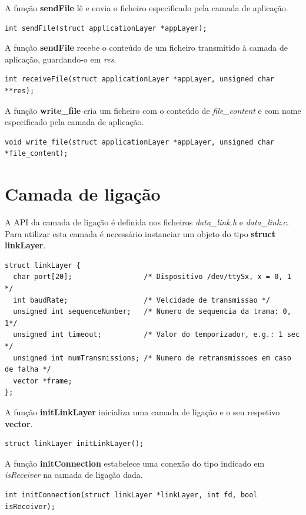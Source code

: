 \documentclass[11pt]{report}
\begin{document}
A função \textbf{sendFile} lê e envia o ficheiro especificado pela camada de aplicação.
\begin{lstlisting}
int sendFile(struct applicationLayer *appLayer);
\end{lstlisting}

A função \textbf{sendFile} recebe o conteúdo de um ficheiro transmitido à camada de aplicação,
guardando-o em \textit{res}.
\begin{lstlisting}
int receiveFile(struct applicationLayer *appLayer, unsigned char **res);
\end{lstlisting}

A função \textbf{write\_file} cria um ficheiro com o conteúdo de \textit{file\_content}
e com nome especificado pela camada de aplicação.
\begin{lstlisting}
void write_file(struct applicationLayer *appLayer, unsigned char *file_content);
\end{lstlisting}

\section{Camada de ligação}

A API da camada de ligação é definida nos ficheiros \textit{data\_link.h} e
\textit{data\_link.c}. Para utilizar esta camada é necessário instanciar um objeto
do tipo \textbf{struct linkLayer}.

\begin{lstlisting}
struct linkLayer {
  char port[20];                 /* Dispositivo /dev/ttySx, x = 0, 1 */
  int baudRate;                  /* Velcidade de transmissao */
  unsigned int sequenceNumber;   /* Numero de sequencia da trama: 0, 1*/
  unsigned int timeout;          /* Valor do temporizador, e.g.: 1 sec */
  unsigned int numTransmissions; /* Numero de retransmissoes em caso de falha */
  vector *frame;
};
\end{lstlisting}

A função \textbf{initLinkLayer} inicializa uma camada de ligação e o seu respetivo \textbf{vector}.
\begin{lstlisting}
struct linkLayer initLinkLayer();
\end{lstlisting}

A função \textbf{initConnection} estabelece uma conexão do tipo indicado em \textit{isReceiver}
na camada de ligação dada.
\begin{lstlisting}
int initConnection(struct linkLayer *linkLayer, int fd, bool isReceiver);
\end{lstlisting}
\end{document}

